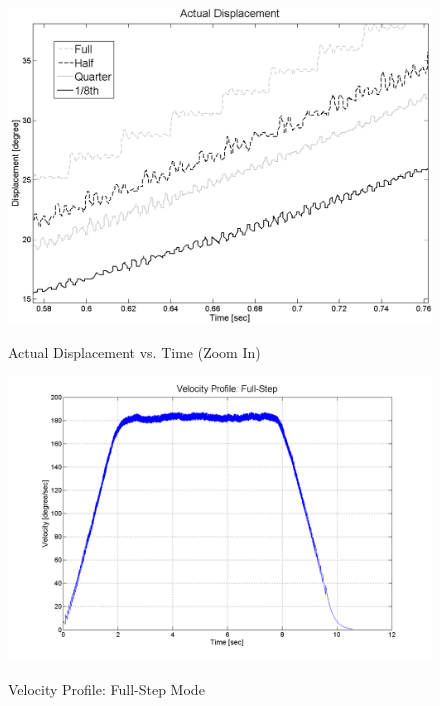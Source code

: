 \documentclass{article}
\theoremstyle{plain}
\theoremstyle{definition}
\theoremstyle{remark}
\begin{document}
\begin{figure}[h]
\begin{center}
\includegraphics[width=12cm]{Q4_ActualPosition_L.png}
\caption{Actual Displacement vs. Time (Zoom In)} \label{tex}
\label{fig:q4_10}
\end{center}
\end{figure}

\begin{figure}[h!]
\begin{center}
\includegraphics[width=12cm]{Q4_full_step.png}
\caption{Velocity Profile: Full-Step Mode} \label{tex}
\label{fig:q4_11}
\end{center}
\end{figure}
\end{document}

